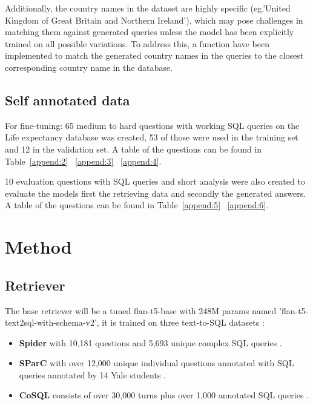 \documentclass[11pt]{article}
\begin{document}
Additionally, the country names in the dataset are highly specific (eg.'United Kingdom of Great Britain and Northern Ireland'), which may pose challenges in matching them against generated queries unless the model has been explicitly trained on all possible variations. To address this, a function have been implemented to match the generated country names in the queries to the closest corresponding country name in the database.

\subsection{Self annotated data}

For fine-tuning:
65 medium to hard questions with working SQL queries on the Life expectancy database was created, 53 of those were used in the training set and 12 in the validation set. A table of the questions can be found in Table~\ref{append:2} ~\ref{append:3} ~\ref{append:4}.

10 evaluation questions with SQL queries and short analysis were also created to evaluate the models first the retrieving data and secondly the generated answers.  A table of the questions can be found in Table~\ref{append:5} ~\ref{append:6}.

\section{Method}

\subsection{Retriever}

The base retriever will be a tuned flan-t5-base with 248M params \cite{flant5} named 'flan-t5-text2sql-with-schema-v2'\cite{t5tuned}, it is trained on three text-to-SQL datasets :
\begin{itemize}
    \item \textbf{Spider} with 10,181 questions and 5,693 unique complex SQL queries \cite{spider}.
    \item \textbf{SParC} with over 12,000 unique individual questions annotated with SQL queries annotated by 14 Yale students \cite{sparc}.
    \item \textbf{CoSQL} consists of over 30,000 turns plus over 1,000 annotated SQL queries \cite{cosql}.
\end{itemize}
\end{document}
